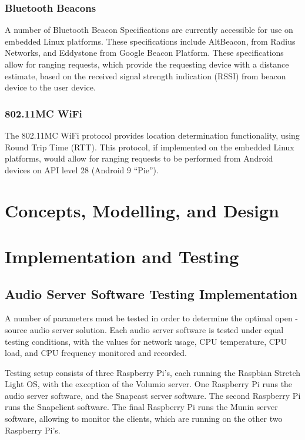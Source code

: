 \documentclass[11pt,a4paper]{scrreprt}
\begin{document}
\subsection{Bluetooth Beacons}\label{bluetooth-beacons}

A number of Bluetooth Beacon Specifications are currently accessible for
use on embedded Linux platforms. These specifications include
AltBeacon\cite{altbeacon}, from Radius Networks, and
Eddystone\cite{eddystone} from Google Beacon Platform. These
specifications allow for ranging requests, which provide the requesting
device with a distance estimate, based on the received signal strength
indication (RSSI) from beacon device to the user device.

\subsection{802.11MC WiFi}\label{mc-wifi}

The 802.11MC WiFi protocol provides location determination
functionality, using Round Trip Time (RTT). This protocol, if
implemented on the embedded Linux platforms, would allow for ranging
requests to be performed from Android devices on API level 28 (Android 9
``Pie'')\cite{droidRTT}.

\chapter{Concepts, Modelling, and
Design}\label{concepts-modelling-and-design}

\chapter{Implementation and Testing}\label{implementation-and-testing}

\section{Audio Server Software Testing
Implementation}\label{audio-server-software-testing-implementation}

A number of parameters must be tested in order to determine the optimal
open -source audio server solution. Each audio server software is tested
under equal testing conditions, with the values for network usage, CPU
temperature, CPU load, and CPU frequency monitored and recorded.

Testing setup consists of three Raspberry Pi's, each running the
Raspbian Stretch Light OS, with the exception of the Volumio server. One
Raspberry Pi runs the audio server software, and the Snapcast server
software. The second Raspberry Pi runs the Snapclient software. The
final Raspberry Pi runs the Munin server software, allowing to monitor
the clients, which are running on the other two Raspberry Pi's.
\end{document}
